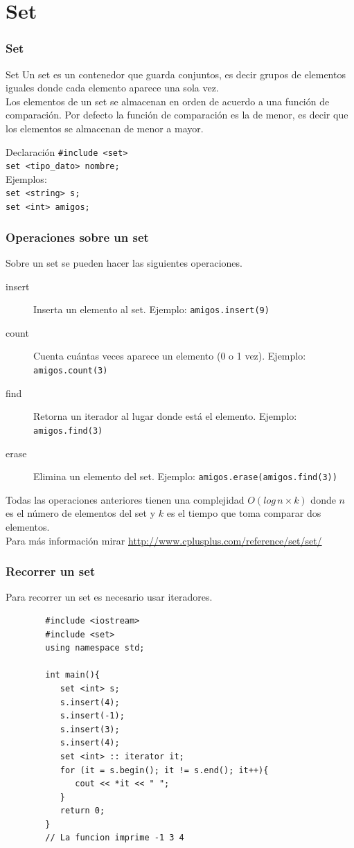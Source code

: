 \documentclass{beamer}
\begin{document}
	\section{Set}
	\begin{frame}[fragile]
		\frametitle{Set}
		\begin{block}{Set}
			Un set es un contenedor que guarda conjuntos, es decir grupos de elementos iguales donde cada elemento aparece una sola vez.\\
			Los elementos de un set se almacenan en orden de acuerdo a una función de comparación. Por defecto la función de comparación es la de menor, es decir que los elementos se almacenan de menor a mayor.\\
		\end{block}
		\begin{block}{Declaración}
			\verb|#include <set>|\\
			\verb|set <tipo_dato> nombre;|\\
			Ejemplos:\\
			\verb|set <string> s;|\\
			\verb|set <int> amigos;|
		\end{block}
	\end{frame}

	\begin{frame}[fragile]
		\frametitle{Operaciones sobre un set}
		Sobre un set se pueden hacer las siguientes operaciones.
		\begin{description}
			\item[insert] Inserta un elemento al set. Ejemplo: \verb|amigos.insert(9)|
			\item[count] Cuenta cuántas veces aparece un elemento (0 o 1 vez). Ejemplo: \verb|amigos.count(3)|
			\item[find] Retorna un iterador al lugar donde está el elemento. Ejemplo: \verb|amigos.find(3)|
			\item[erase] Elimina un elemento del set. Ejemplo: \verb|amigos.erase(amigos.find(3))|
		\end{description}
		Todas las operaciones anteriores tienen una complejidad $O(log\,n \times k)$ donde $n$ es el número de elementos del set y $k$ es el tiempo que toma comparar dos elementos.\\
		Para más información mirar \url{http://www.cplusplus.com/reference/set/set/}
	\end{frame}

	\begin{frame}[fragile]
		\frametitle{Recorrer un set}
		Para recorrer un set es necesario usar iteradores.\\
		\begin{lstlisting}
		#include <iostream>
		#include <set>
		using namespace std;

		int main(){
		   set <int> s;
		   s.insert(4); 
		   s.insert(-1);
		   s.insert(3);
		   s.insert(4);
		   set <int> :: iterator it;
		   for (it = s.begin(); it != s.end(); it++){
		      cout << *it << " ";
		   }
		   return 0;
		}
		// La funcion imprime -1 3 4
		\end{lstlisting}
	\end{frame}
	
\end{document}
